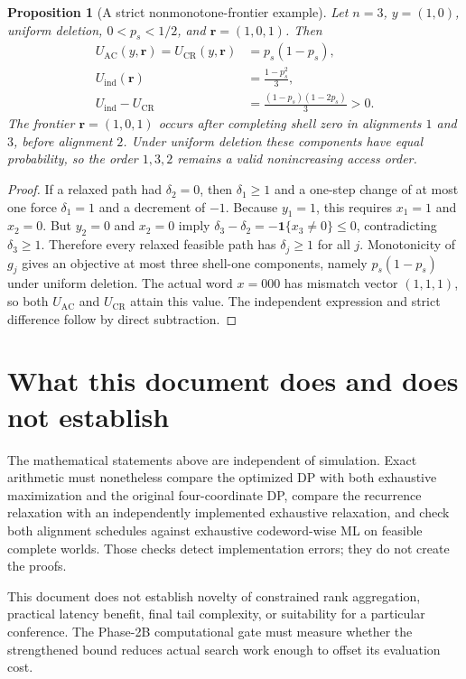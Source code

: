 \documentclass[11pt]{article}
\newtheorem{proposition}[theorem]{Proposition}
\theoremstyle{remark}
\newcommand{\ind}{\mathbf 1}
\begin{document}
\begin{proposition}[A strict nonmonotone-frontier example]
Let $n=3$, $y=(1,0)$, uniform deletion, $0<p_s<1/2$, and
$\mathbf r=(1,0,1)$. Then
\begin{align*}
 U_{\mathrm{AC}}(y,\mathbf r)=U_{\mathrm{CR}}(y,\mathbf r)&=p_s(1-p_s),\\
 U_{\mathrm{ind}}(\mathbf r)&=\frac{1-p_s^2}{3},\\
 U_{\mathrm{ind}}-U_{\mathrm{CR}}&=\frac{(1-p_s)(1-2p_s)}{3}>0.
\end{align*}
The frontier $\mathbf r=(1,0,1)$ occurs after completing shell zero in alignments
$1$ and $3$, before alignment $2$. Under uniform deletion these components have equal
probability, so the order $1,3,2$ remains a valid nonincreasing access order.
\end{proposition}

\begin{proof}
If a relaxed path had $\delta_2=0$, then $\delta_1\ge1$ and a one-step change of at most
one force $\delta_1=1$ and a decrement of $-1$. Because $y_1=1$, this requires
$x_1=1$ and $x_2=0$. But $y_2=0$ and $x_2=0$ imply
$\delta_3-\delta_2=-\ind\{x_3\ne0\}\le0$, contradicting $\delta_3\ge1$.
Therefore every relaxed feasible path has $\delta_j\ge1$ for all $j$. Monotonicity of
$g_j$ gives an objective at most three shell-one components, namely $p_s(1-p_s)$ under
uniform deletion. The actual word $x=000$ has mismatch vector $(1,1,1)$, so both
$U_{\mathrm{AC}}$ and $U_{\mathrm{CR}}$ attain this value. The independent expression
and strict difference follow by direct subtraction.
\end{proof}


\section{What this document does and does not establish}

The mathematical statements above are independent of simulation. Exact arithmetic must
nonetheless compare the optimized DP with both exhaustive maximization and the original
four-coordinate DP, compare the recurrence relaxation with an independently implemented
exhaustive relaxation, and check both alignment schedules against exhaustive codeword-wise
ML on feasible complete worlds. Those checks detect implementation errors;
they do not create the proofs.

This document does not establish novelty of constrained rank aggregation, practical
latency benefit, final tail complexity, or suitability for a particular conference. The
Phase-2B computational gate must measure whether the strengthened bound reduces actual
search work enough to offset its evaluation cost.
\end{document}
